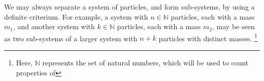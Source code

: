 We may always separate a system of particles, and form sub-systems, by using a definite criterium. For example, a system with $n\in\mathbb{N}$ particles, each with a mass $m_1$, and another system with $k\in\mathbb{N}$ particles, each with a mass $m_2$, may be seen as two sub-systems of a larger system with $n+k$ particles with distinct masses. \footnote{Here, $\mathbb{N}$ represents the set of natural numbers, which will be used to count properties of }